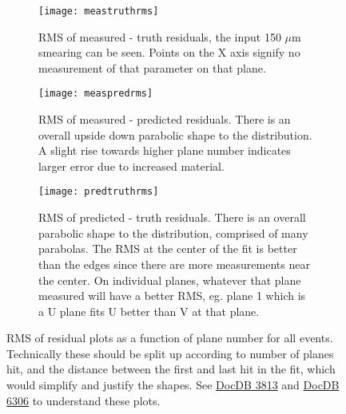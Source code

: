 \begin{figure}
    \centering
    \begin{subfigure}[]{0.5\textwidth}
        \centering
        \texttt{[image: meastruthrms]} 
        \caption{RMS of measured - truth residuals, the input 150 $\mu$m smearing can be seen. Points on the X axis signify no measurement of that parameter on that plane.}
    \end{subfigure}

    \begin{subfigure}[]{0.5\textwidth}
        \centering
        \texttt{[image: measpredrms]} 
        \caption{RMS of measured - predicted residuals. There is an overall upside down parabolic shape to the distribution. A slight rise towards higher plane number indicates larger error due to increased material.}
    \end{subfigure}
    
    \begin{subfigure}[]{0.5\textwidth}
        \centering
        \texttt{[image: predtruthrms]} 
        \caption{RMS of predicted - truth residuals. There is an overall parabolic shape to the distribution, comprised of many parabolas. The RMS at the center of the fit is better than the edges since there are more measurements near the center. On individual planes, whatever that plane measured will have a better RMS, eg. plane 1 which is a U plane fits U better than V at that plane.}
    \end{subfigure}

    \caption{RMS of residual plots as a function of plane number for all events. Technically these should be split up according to number of planes hit, and the distance between the first and last hit in the fit, which would simplify and justify the shapes. See \href{http://gm2-docdb.fnal.gov:8080/cgi-bin/ShowDocument?docid=3813}{DocDB 3813} and \href{http://gm2-docdb.fnal.gov:8080/cgi-bin/ShowDocument?docid=6306}{DocDB 6306} to understand these plots.}
\end{figure}



